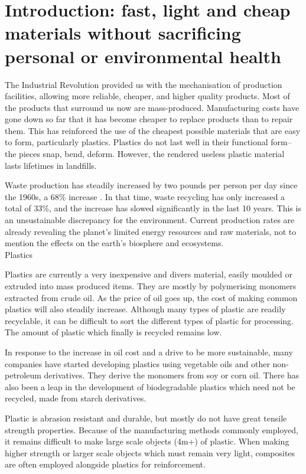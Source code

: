 \documentclass[]{report}
\begin{document}
\chapter{Introduction: fast, light and cheap materials without sacrificing personal or environmental health}



The Industrial Revolution provided us with the mechanisation of production facilities, allowing more reliable, cheaper, and higher quality products.   Most of the products that surround us now are mass-produced.  Manufacturing costs have gone down so far that it has become cheaper to replace products than to repair them.  This has reinforced the use of the cheapest possible materials that are easy to form, particularly plastics.  Plastics do not last well in their functional form-- the pieces snap, bend, deform.  However, the rendered useless plastic material lasts lifetimes in landfills.

Waste production has steadily increased by two pounds per person per day since the 1960s, a 68\% increase \cite{epa}.  In that time, waste recycling has only increased a total of 33\%, and the increase has slowed significantly in the last 10 years.  This is an unsustainable discrepancy for the environment.  Current production rates are already revealing the planet's limited energy resources and raw materials, not to mention the effects on the earth's biosphere and ecosystems.  \\

{\sc Plastics}

Plastics are currently a very inexpensive and divers material, easily moulded or extruded into mass produced items.  They are mostly by polymerising monomers extracted from crude oil.  As the price of oil goes up, the cost of making common plastics will also steadily increase. Although many types of plastic are readily recyclable, it can be difficult to sort the different types of plastic for processing.  The amount of plastic which finally is recycled remains low. 

In response to the increase in oil cost and a drive to be more sustainable, many companies have started developing plastics using vegetable oils and other non-petroleum derivatives.  They derive the monomers from soy or corn oil.  There has also been a leap in the development of biodegradable plastics which need not be recycled, made from starch derivatives.

Plastic is abrasion resistant and durable, but mostly do not have great tensile strength properties.  Because of the manufacturing methods commonly employed, it remains difficult to make large scale objects (4m+) of plastic.  When making higher strength or larger scale objects which must remain very light, composites are often employed alongside plastics for reinforcement.\\
\end{document}
